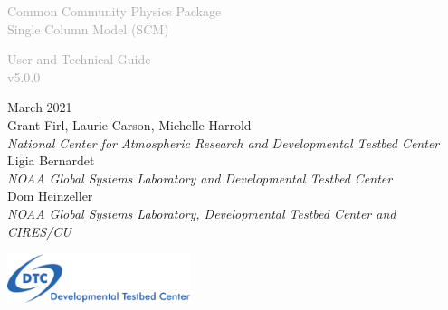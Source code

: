 \begin{titlepage}
\renewcommand{\thefootnote}{\fnsymbol{footnote}}

\vspace*{1em}
\noindent

\begin{center}
\textcolor{darkgray}{\bigsf Common Community Physics Package\\[0.5ex] Single Column Model (SCM)}
\vspace*{1em}\par

\textcolor{darkgray}{\bigst User and Technical Guide\\[0.5ex] v5.0.0}
\vspace*{1em}\par

\large{March 2021}\\

Grant Firl, Laurie Carson, Michelle Harrold\\
\textit{\small{National Center for Atmospheric Research and Developmental Testbed Center}}\\[4em]

Ligia Bernardet\\
\textit{\small{NOAA Global Systems Laboratory and Developmental Testbed Center}}\\[4em]

Dom Heinzeller\\
\textit{\small{NOAA Global Systems Laboratory, Developmental Testbed Center and CIRES/CU}}\\[4em]

\vspace{4em}

\includegraphics[width=0.4\textwidth]{images/dtc_logo.png}\\[2em]

\end{center}
\end{titlepage}
\pagebreak{}
